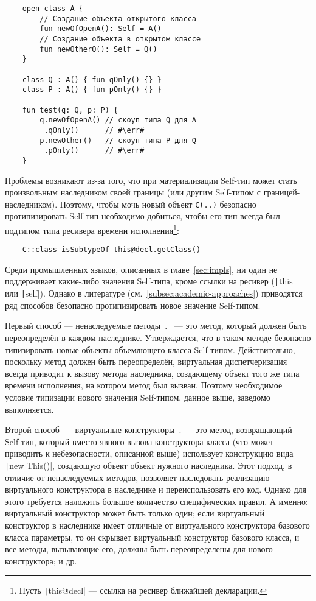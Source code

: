\begin{verbatim}
    open class A {
        // Создание объекта открытого класса
        fun newOfOpenA(): Self = A()
        // Создание объекта в открытом классе
        fun newOtherQ(): Self = Q()
    }

    class Q : A() { fun qOnly() {} }
    class P : A() { fun pOnly() {} }

    fun test(q: Q, p: P) {
        q.newOfOpenA() // скоуп типа Q для A
         .qOnly()      // #\err#
        p.newOther()   // скоуп типа P для Q
         .pOnly()      // #\err#
    }
\end{verbatim}

Проблемы возникают из-за того, что при материализации Self-тип может стать произвольным наследником своей границы (или другим Self-типом с границей-наследником).
Поэтому, чтобы мочь новый объект \texttt{C(..)} безопасно протипизировать Self-тип необходимо добиться, чтобы его тип всегда был подтипом типа ресивера времени исполнения\footnote{Пусть \texttt|this@decl| --- ссылка на ресивер ближайшей декларации.\label{foot:this-decl}}:
\begin{verbatim}
    C::class isSubtypeOf this@decl.getClass()
\end{verbatim}

Среди промышленных языков, описанных в главе~\ref{sec:impls}, ни один не поддерживает какие-либо значения Self-типа, кроме ссылки на ресивер (\texttt|this| или \texttt|self|).
Однако в литературе (см.~\ref{subsec:academic-approaches}) приводятся ряд способов безопасно протипизировать новое значение Self-типом.

Первый способ --- ненаследуемые методы~\cite{saito2009matching}.
~--- это метод, который должен быть переопределён в каждом наследнике.
Утверждается, что в таком методе безопасно типизировать новые объекты объемлющего класса Self-типом.
Действительно, поскольку метод должен быть переопределён, виртуальная диспетчеризация всегда приводит к вызову метода наследника, создающему объект того же типа времени исполнения, на котором метод был вызван.
Поэтому необходимое условие типизации нового значения Self-типом, данное выше, заведомо выполняется.

Второй способ~--- виртуальные конструкторы~\cite{ryu2016thistype}.
 --- это метод, возвращающий Self-тип, который вместо явного вызова конструктора класса (что может приводить к небезопасности, описанной выше) использует конструкцию вида \texttt|new This()|, создающую объект объект нужного наследника.
Этот подход, в отличие от ненаследуемых методов, позволяет наследовать реализацию виртуального конструктора в наследнике и переиспользовать его код.
Однако для этого требуется наложить большое количество специфических правил.
А именно: виртуальный конструктор может быть только один; если виртуальный конструктор в наследнике имеет отличные от виртуального конструктора базового класса параметры, то он скрывает виртуальный конструктор базового класса, и все методы, вызывающие его, должны быть переопределены для нового конструктора; и др.

